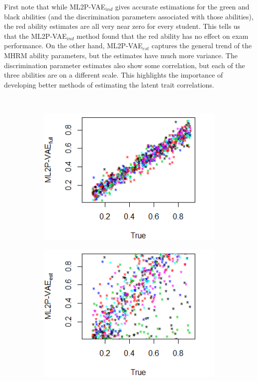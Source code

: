 First note that while ML2P-VAE$_{ind}$ gives accurate estimations for the green and black abilities (and the discrimination parameters associated with those abilities), the red ability estimates are all very near zero for every student. This tells us that the ML2P-VAE$_{ind}$ method found that the red ability has no effect on exam performance. On the other hand, ML2P-VAE$_{est}$ captures the general trend of the MHRM ability  parameters, but the estimates have much more variance. The discrimination parameter estimates also show some correlation, but each of the three abilities are on a different scale. This highlights the importance of developing better methods of estimating the latent trait correlations.
\begin{figure}[h]
\centering
{}\\
    \begin{subfigure}{.32\textwidth}
      \centering
      \includegraphics[width=.9\linewidth]{img/ml_journal_results/20skills/vae_full_disc_20skills.png}
    \end{subfigure}
    \begin{subfigure}{.32\textwidth}
      \centering
      \includegraphics[width=.9\linewidth]{img/ml_journal_results/20skills/vae_est_disc_20skills.png}

\end{subfigure}
\end{figure}
